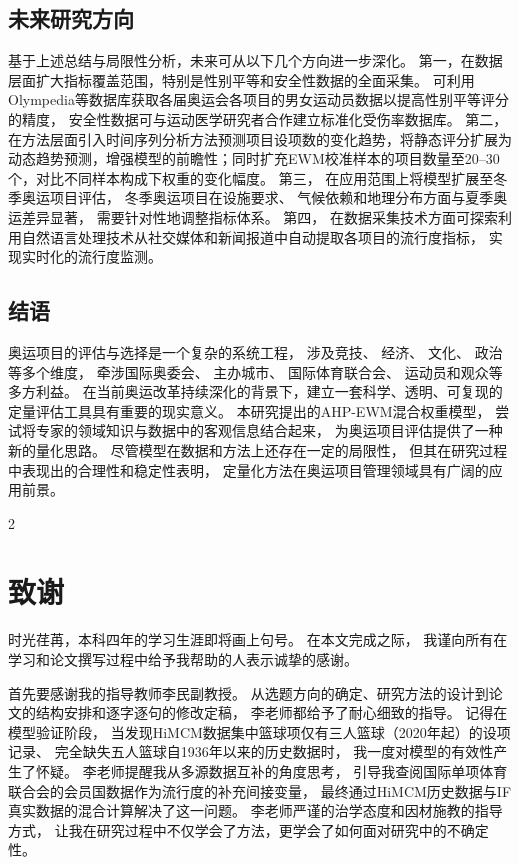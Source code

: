 \documentclass[twoside]{CUGThesis}
\begin{document}
\subsection{未来研究方向}

基于上述总结与局限性分析，未来可从以下几个方向进一步深化。
第一，在数据层面扩大指标覆盖范围，特别是性别平等和安全性数据的全面采集。
可利用Olympedia等数据库获取各届奥运会各项目的男女运动员数据以提高性别平等评分的精度，
安全性数据可与运动医学研究者合作建立标准化受伤率数据库。
第二，在方法层面引入时间序列分析方法预测项目设项数的变化趋势，将静态评分扩展为动态趋势预测，增强模型的前瞻性；同时扩充EWM校准样本的项目数量至20--30个，对比不同样本构成下权重的变化幅度。
第三，
在应用范围上将模型扩展至冬季奥运项目评估，
冬季奥运项目在设施要求、
气候依赖和地理分布方面与夏季奥运差异显著，
需要针对性地调整指标体系。
第四，
在数据采集技术方面可探索利用自然语言处理技术从社交媒体和新闻报道中自动提取各项目的流行度指标\cite{Song2025}，
实现实时化的流行度监测。

\subsection{结语}

奥运项目的评估与选择是一个复杂的系统工程，
涉及竞技、
经济、
文化、
政治等多个维度，
牵涉国际奥委会、
主办城市、
国际体育联合会、
运动员和观众等多方利益。
在当前奥运改革持续深化的背景下，建立一套科学、透明、可复现的定量评估工具具有重要的现实意义。
本研究提出的AHP-EWM混合权重模型，
尝试将专家的领域知识与数据中的客观信息结合起来，
为奥运项目评估提供了一种新的量化思路。
尽管模型在数据和方法上还存在一定的局限性，
但其在研究过程中表现出的合理性和稳定性表明，
定量化方法在奥运项目管理领域具有广阔的应用前景。


\begin{spacing}{2}\section*{致谢}\end{spacing}
{}

时光荏苒，本科四年的学习生涯即将画上句号。
在本文完成之际，
我谨向所有在学习和论文撰写过程中给予我帮助的人表示诚挚的感谢。

首先要感谢我的指导教师李民副教授。
从选题方向的确定、研究方法的设计到论文的结构安排和逐字逐句的修改定稿，
李老师都给予了耐心细致的指导。
记得在模型验证阶段，
当发现HiMCM数据集中篮球项仅有三人篮球（2020年起）的设项记录、
完全缺失五人篮球自1936年以来的历史数据时，
我一度对模型的有效性产生了怀疑。
李老师提醒我从多源数据互补的角度思考，
引导我查阅国际单项体育联合会的会员国数据作为流行度的补充间接变量，
最终通过HiMCM历史数据与IF真实数据的混合计算解决了这一问题。
李老师严谨的治学态度和因材施教的指导方式，
让我在研究过程中不仅学会了方法，更学会了如何面对研究中的不确定性。
\end{document}

